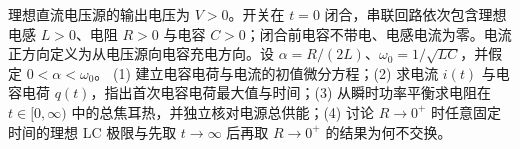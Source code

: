 理想直流电压源的输出电压为 \(V>0\)。开关在 \(t=0\) 闭合，串联回路依次包含理想电感 \(L>0\)、电阻 \(R>0\) 与电容 \(C>0\)；闭合前电容不带电、电感电流为零。电流正方向定义为从电压源向电容充电方向。设 \(\alpha=R/(2L)\)、\(\omega_0=1/\sqrt{LC}\)，并假定 \(0<\alpha<\omega_0\)。
(1) 建立电容电荷与电流的初值微分方程；(2) 求电流 \(i(t)\) 与电容电荷 \(q(t)\)，指出首次电容电荷最大值与时间；(3) 从瞬时功率平衡求电阻在 \(t\in[0,\infty)\) 中的总焦耳热，并独立核对电源总供能；(4) 讨论 \(R\to0^+\) 时任意固定时间的理想 LC 极限与先取 \(t\to\infty\) 后再取 \(R\to0^+\) 的结果为何不交换。
